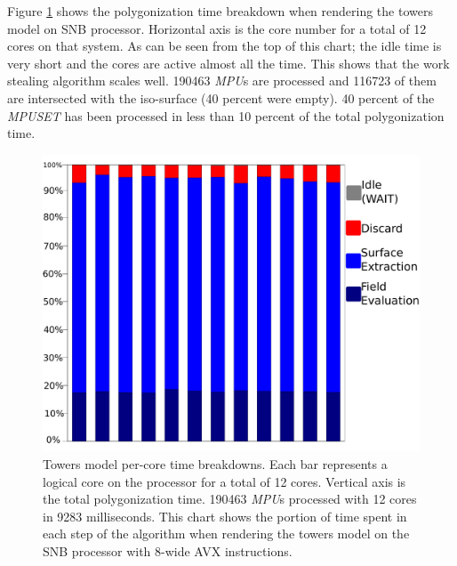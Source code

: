 Figure \ref{fig:TowerSNBTimeBreakDown} shows the polygonization time breakdown when rendering the towers model on SNB processor. 
Horizontal axis is the core number for a total of 12 cores on that system. As can be seen from the top of this chart; 
the idle time is very short and the cores are active almost all the time. This shows that the work stealing algorithm scales well. 
190463 \textit{MPU}s are processed and 116723 of them are intersected with the iso-surface (40 percent were empty).
40 percent of the \textit{MPUSET} has been processed in less than 10 percent of the total polygonization time.

\begin{figure}[htb]
  \centering
  \includegraphics[width = 1.0\linewidth]{figures/cpupoly/PerCoreTimeBreakDown.pdf}
  \caption{\label{fig:TowerSNBTimeBreakDown}
  {Towers model per-core time breakdowns. Each bar represents a logical core on the processor for a total of 12 cores. 
  Vertical axis is the total polygonization time. 190463 \textit{MPU}s processed with 12 cores in 9283 milliseconds. 
  This chart shows the portion of time spent in each step of the algorithm when rendering the towers model on the 
  SNB processor with 8-wide AVX instructions.}
}
\end{figure}

